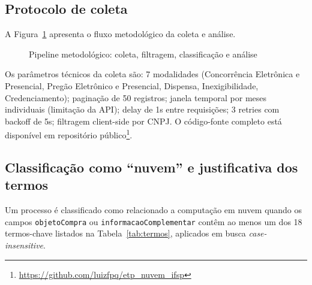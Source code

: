 \documentclass[12pt]{article}
\begin{document}
\subsection{Protocolo de coleta}

A Figura~\ref{fig:pipeline} apresenta o fluxo metodológico da coleta e análise.

\begin{figure}[ht]
\centering
{}
\caption{Pipeline metodológico: coleta, filtragem, classificação e análise}
\label{fig:pipeline}
\end{figure}

Os parâmetros técnicos da coleta são: 7 modalidades (Concorrência Eletrônica e Presencial, Pregão Eletrônico e Presencial, Dispensa, Inexigibilidade, Credenciamento); paginação de 50 registros; janela temporal por meses individuais (limitação da API); delay de 1s entre requisições; 3 retries com backoff de 5s; filtragem client-side por CNPJ. O código-fonte completo está disponível em repositório público\footnote{\url{https://github.com/luizfpq/etp_nuvem_ifsp}}.

\subsection{Classificação como ``nuvem'' e justificativa dos termos}

Um processo é classificado como relacionado a computação em nuvem quando os campos \texttt{objetoCompra} ou \texttt{informacaoComplementar} contêm ao menos um dos 18 termos-chave listados na Tabela~\ref{tab:termos}, aplicados em busca \textit{case-insensitive}.
\end{document}
